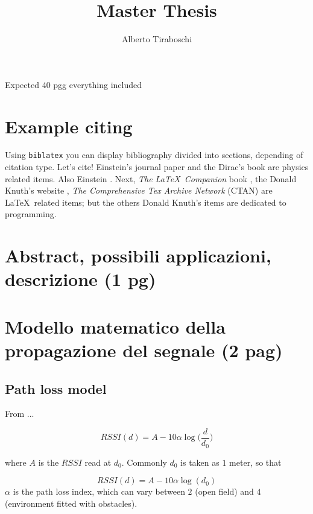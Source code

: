 \documentclass[12pt]{report}
\title{Master Thesis}
\author{Alberto Tiraboschi}
\begin{document}

\maketitle
\cleardoublepage

\tableofcontents
\cleardoublepage

Expected 40 pgg everything included
\chapter{Example citing}

Using \texttt{biblatex} you can display bibliography divided into sections, depending of citation type. 
Let's cite! Einstein's journal paper \cite{friis_m} and the Dirac's book \cite{dirac} are physics related items. Also Einstein \cite{einstein}. Next, \textit{The \LaTeX\ Companion} book \cite{latexcompanion}, the Donald Knuth's website \cite{knuthwebsite}, \textit{The Comprehensive Tex Archive Network} (CTAN) \cite{ctan} are \LaTeX\ related items; but the others Donald Knuth's items \cite{knuth-fa,knuth-acp} are dedicated to programming. 
\clearpage

\chapter{Abstract, possibili applicazioni, descrizione (1 pg)}
\clearpage

\chapter{Modello matematico della propagazione del segnale (2 pag)}
\section{Path loss model}
From \cite{friis_m}...

\begin{equation}
RSSI(d) = A-10\alpha\log\bigg(\frac{d}{d_0}\bigg)    
\end{equation}

where $A$ is the $RSSI$ read at $d_0$. Commonly $d_0$ is taken as $1$ meter, so that 

\begin{equation}
RSSI(d) = A-10\alpha\log(d_0)    
\end{equation}
$\alpha$ is the path loss index, which can vary between $2$ (open field) and $4$ (environment fitted with obstacles).
\clearpage
\end{document}
